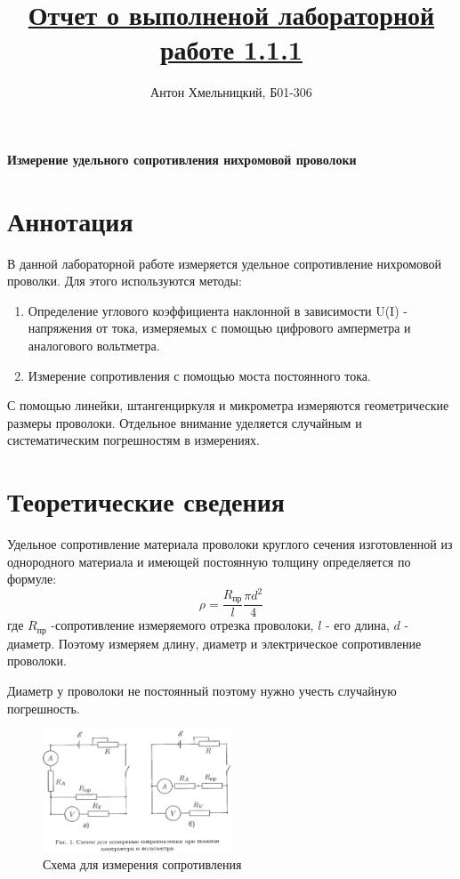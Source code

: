 \documentclass[a4paper]{article}
\title{\underline{Отчет о выполненой лабораторной работе 1.1.1}}
\author{Антон Хмельницкий, Б01-306}
\begin{document}
\maketitle
\textbf{Измерение удельного сопротивления нихромовой проволоки}

\section{Аннотация}

В данной лабораторной работе измеряется удельное сопротивление нихромовой проволки. 
Для этого используются методы:
\begin{enumerate}
\item Определение углового коэффициента наклонной в зависимости U(I) - напряжения от тока, измеряемых с помощью цифрового амперметра и аналогового вольтметра.
\item Измерение сопротивления с помощью моста постоянного тока.
\end{enumerate}\par
С помощью линейки, штангенциркуля и микрометра измеряются геометрические размеры проволоки.
Отдельное внимание уделяется случайным и систематическим погрешностям в измерениях.\par

\section{Теоретические сведения}

Удельное сопротивление материала проволоки круглого сечения изготовленной из однородного материала и имеющей постоянную толщину определяется по формуле:
\[ \rho = \frac{R_\text{пр}}{l}\frac{\pi d^2}{4}  \]
где $R_\text{пр}$ -сопротивление измеряемого отрезка проволоки, $l$ - его длина, $d$ - диаметр.
Поэтому измеряем длину, диаметр и электрическое сопротивление проволоки.\par
Диаметр у проволоки не постоянный поэтому нужно учесть случайную погрешность.
\begin{figure}[t]
    \centering
    \includegraphics[width=0.5\textwidth]{shema}
    \caption{Схема для измерения сопротивления}
\end{figure}
\end{document}
